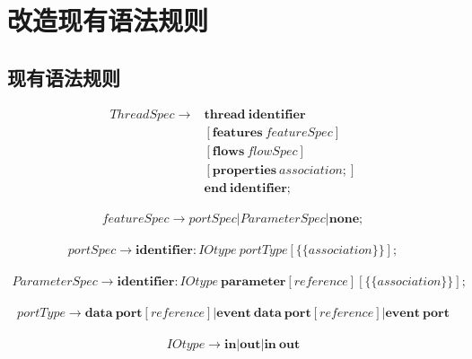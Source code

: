 \documentclass[UTF8]{ctexart}
\begin{document}
\section{改造现有语法规则}
\subsection{现有语法规则}

\begin{equation*} 
\begin{split}
ThreadSpec \rightarrow & \bm{thread \  identifier} \\
& [ \bm{features}  \ featureSpec ] \\
& [ \bm{flows} \  flowSpec ] \\
& [ \bm{properties} \ association\bm{;} ] \\
& \bm{end \ identifier ;}
\end{split}
\end{equation*}

\begin{equation*} 
\begin{split}
featureSpec \rightarrow portSpec|ParameterSpec| \bm{none ;}
\end{split}
\end{equation*}

\begin{equation*} 
\begin{split}
portSpec \rightarrow \bm{identifier :} IOtype \ portType [ \bm{\{} \{ association \} \bm{\}} ] \bm{;}
\end{split}
\end{equation*}

\begin{equation*} 
\begin{split}
ParameterSpec \rightarrow \bm{identifier :}  IOtype \ \bm{parameter} [ reference ][ \bm{\{} \{ association \} \bm{\}} ] \bm{;}
\end{split}
\end{equation*}

\begin{equation*} 
\begin{split}
portType \rightarrow \bm{data \  port}[ reference ] | \bm{event \ data \ port} [ reference ]| \bm{event \  port}
\end{split}
\end{equation*}

\begin{equation*} 
\begin{split}
IOtype \rightarrow \bm{in} | \bm{out} | \bm{in \ out} 
\end{split}
\end{equation*}
\end{document}
